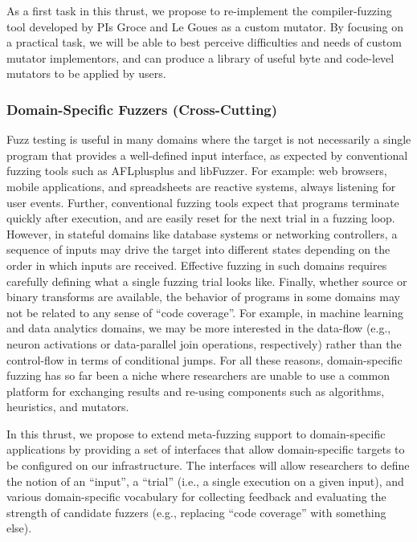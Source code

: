 As a first task in this thrust, we propose to re-implement the compiler-fuzzing 
tool developed by PIs Groce and Le Goues as a custom mutator.  By focusing on a 
practical task, we will be able to best perceive difficulties and needs of 
custom mutator implementors, and can produce a library of useful byte and 
code-level mutators to be applied by users.

\subsubsection{Domain-Specific Fuzzers (Cross-Cutting)}

Fuzz testing is useful in many domains where the target is not necessarily a single program that
provides a well-defined input interface, as expected by conventional fuzzing tools such as
AFLplusplus and libFuzzer. For example: web browsers, mobile applications, and spreadsheets 
are reactive systems, always listening for user events. Further, conventional fuzzing tools 
expect that programs terminate quickly after execution, and are easily reset 
for the next trial in a fuzzing loop. However, in stateful domains like database systems 
or networking controllers, a sequence of inputs may drive the target into different states
depending on the order in which inputs are received. Effective fuzzing in such domains requires
carefully defining what a single fuzzing trial looks like. Finally, whether source or binary 
transforms are available, the behavior of programs in some domains may not be related to
any sense of ``code coverage''. For example, in machine learning and data analytics domains,
we may be more interested in the data-flow (e.g., neuron activations or 
data-parallel join operations, respectively) rather than the control-flow in terms of 
conditional jumps. For all these reasons, domain-specific fuzzing has so far been a niche where
researchers are unable to use a common platform for exchanging results and re-using components
such as algorithms, heuristics, and mutators.

In this thrust, we propose to extend meta-fuzzing support to domain-specific applications by
providing a set of interfaces that allow domain-specific targets to be configured on our
infrastructure. The interfaces will allow researchers to define the notion of an ``input'',
a ``trial'' (i.e., a single execution on a given input), and various domain-specific vocabulary
for collecting feedback and evaluating the strength of candidate fuzzers (e.g., replacing ``code
coverage'' with something else). 

